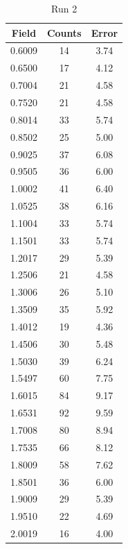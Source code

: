 \begin{table}[h!]
\caption{Run 2}
\begin{tabular}{|c|c|c|} \hline
Field	&	Counts	&	Error	\\ \hline
0.6009	&	14	&	3.74	\\ \hline
0.6500	&	17	&	4.12	\\ \hline
0.7004	&	21	&	4.58	\\ \hline
0.7520	&	21	&	4.58	\\ \hline
0.8014	&	33	&	5.74	\\ \hline
0.8502	&	25	&	5.00	\\ \hline
0.9025	&	37	&	6.08	\\ \hline
0.9505	&	36	&	6.00	\\ \hline
1.0002	&	41	&	6.40	\\ \hline
1.0525	&	38	&	6.16	\\ \hline
1.1004	&	33	&	5.74	\\ \hline
1.1501	&	33	&	5.74	\\ \hline
1.2017	&	29	&	5.39	\\ \hline
1.2506	&	21	&	4.58	\\ \hline
1.3006	&	26	&	5.10	\\ \hline
1.3509	&	35	&	5.92	\\ \hline
1.4012	&	19	&	4.36	\\ \hline
1.4506	&	30	&	5.48	\\ \hline
1.5030	&	39	&	6.24	\\ \hline
1.5497	&	60	&	7.75	\\ \hline
1.6015	&	84	&	9.17	\\ \hline
1.6531	&	92	&	9.59	\\ \hline
1.7008	&	80	&	8.94	\\ \hline
1.7535	&	66	&	8.12	\\ \hline
1.8009	&	58	&	7.62	\\ \hline
1.8501	&	36	&	6.00	\\ \hline
1.9009	&	29	&	5.39	\\ \hline
1.9510	&	22	&	4.69	\\ \hline
2.0019	&	16	&	4.00	\\ \hline
\end{tabular}
\end{table}
